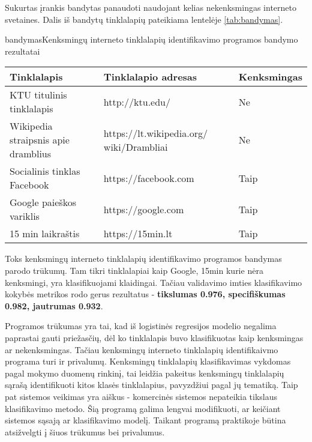 
Sukurtas įrankis bandytas panaudoti naudojant kelias nekenksmingas interneto svetaines. Dalis iš bandytų
tinklalapių pateikiama lentelėje \vref{tab:bandymas}.

\begin{ktutable}{bandymas}{Kenksmingų interneto tinklalapių identifikavimo programos bandymo rezultatai}
    \begin{tabular}{|p{5 cm}|p{5 cm}|p{3 cm}|}
    \hline
    Tinklalapis & Tinklalapio adresas & Kenksmingas \\ \hline
    KTU titulinis tinklalapis & http://ktu.edu/ & Ne \\ \hline
    Wikipedia straipsnis apie dramblius & https://lt.wikipedia.org/ wiki/Drambliai & Ne \\ \hline
    Socialinis tinklas Facebook & https://facebook.com & Taip \\ \hline
    Google paieškos variklis & https://google.com & Taip \\ \hline
    15 min laikraštis & https://15min.lt & Taip \\ \hline
    \end{tabular}
\end{ktutable}

Toks kenksmingų interneto tinklalapių identifikavimo programos bandymas parodo trūkumų. Tam tikri tinklalapiai kaip Google, 15min kurie nėra kenksmingi,
yra klasifikuojami klaidingai. Tačiau validavimo imties klasifikavimo kokybės metrikos rodo gerus rezultatus - \textbf{tikslumas 0.976, specifiškumas 0.982, jautrumas 0.932}.

Programos trūkumas yra tai, kad iš logistinės regresijos modelio negalima paprastai gauti priežasčių, dėl ko tinklalapis buvo klasifikuotas kaip kenksmingas ar nekenksmingas. Tačiau kenksmingų interneto tinklalapių identifikaivmo programa turi ir privalumų. Kenksmingų tinklalapių klasifikavimas vykdomas pagal mokymo duomenų rinkinį, tai leidžia pakeitus kenksmingų tinklalapių sąrašą identifikuoti kitos klasės tinklalapius, pavyzdžiui pagal jų tematiką. Taip pat sistemos veikimas yra aiškus - komercinės sistemos nepateikia tikslaus klasifikavimo metodo. Šią programą galima lengvai modifikuoti, ar keičiant sistemos sąsają ar klasifikavimo modelį. Taikant programą praktikoje būtina atsižvelgti į šiuos trūkumus bei privalumus.